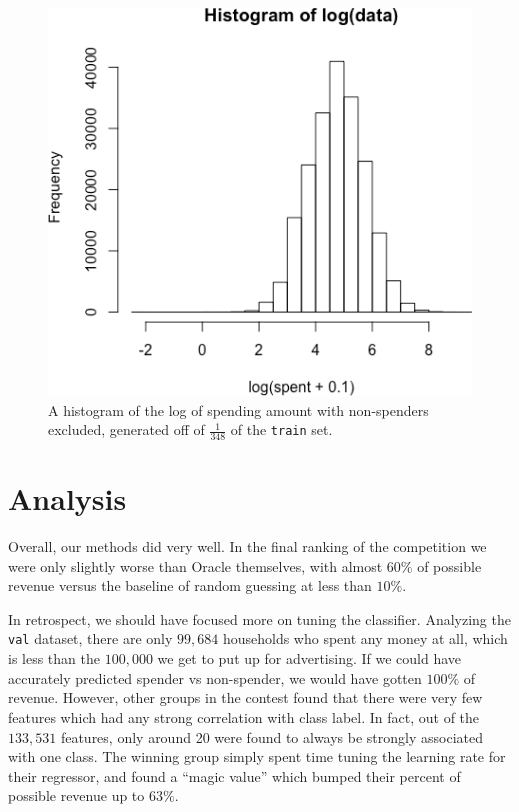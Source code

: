 \documentclass{article}
\begin{document}
\begin{figure}[H]
\begin{center}
	\includegraphics[width=.8 \linewidth]{log-spend-gt-0.png}
\end{center}
	\vspace{-1em}
	\caption{A histogram of the log of spending amount with non-spenders excluded, generated off of $\frac{1}{348}$ of the \texttt{train} set.}
	\label{fig:logspend-non}
\end{figure}

\section*{Analysis}
Overall, our methods did very well. In the final ranking of the competition we were only slightly worse than Oracle themselves, with almost $60\%$ of possible revenue versus the baseline of random guessing at less than $10\%$. 

In retrospect, we should have focused more on tuning the classifier. Analyzing the \texttt{val} dataset, there are only $99,684$ households who spent any money at all, which is less than the $100,000$ we get to put up for advertising. If we could have accurately predicted spender vs non-spender, we would have gotten $100\%$ of revenue. However, other groups in the contest found that there were very few features which had any strong correlation with class label. In fact, out of the $133,531$ features, only around 20 were found to always be strongly associated with one class. The winning group simply spent time tuning the learning rate for their regressor, and found a ``magic value'' which bumped their percent of possible revenue up to $63\%$. 
\end{document}
